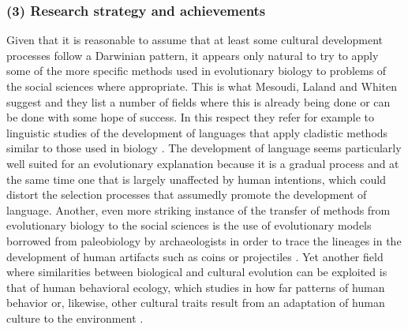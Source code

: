 \subsubsection{(3) Research strategy and achievements}
\label{culturalEvolutionAssets}
Given that it is reasonable to assume that at least some cultural development
processes follow a Darwinian pattern, it appears only natural to try to apply
some of the more specific methods used in evolutionary biology to problems of
the social sciences where appropriate. This is what Mesoudi, Laland and Whiten
suggest \cite[]{mesoudi-laland-whiten:2006} and they list a number of fields
where this is already being done or can be done with some hope of success. In
this respect they refer for example to linguistic studies of the development
of languages that apply cladistic methods similar to those used in biology
\cite[p.\ 333]{mesoudi-laland-whiten:2006}. The development of language seems
particularly well suited for an evolutionary explanation because it is a
gradual process and at the same time one that is largely unaffected by human
intentions, which could distort the selection processes that assumedly promote
the development of language. Another, even more striking instance of the
transfer of methods from evolutionary biology to the social sciences is the
use of evolutionary models borrowed from paleobiology by archaeologists in
order to trace the lineages in the development of human artifacts such as
coins or projectiles \cite[p.\ 334]{mesoudi-laland-whiten:2006}. Yet another
field where similarities between biological and cultural evolution can be
exploited is that of human behavioral ecology, which studies in how far
patterns of human behavior or, likewise, other cultural traits result from an
adaptation of human culture to the environment \cite[p.\ 
335]{mesoudi-laland-whiten:2006}.

